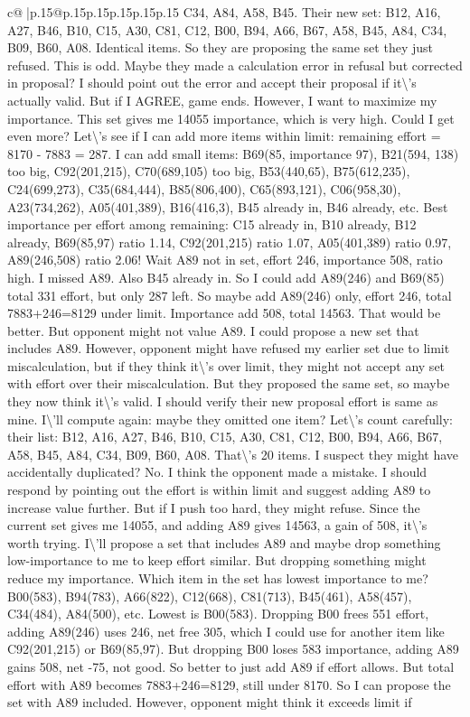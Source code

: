 \documentclass{article}
\begin{document}
{\begin{supertabular}{c@{$\;$}|p{.15\linewidth}@{}p{.15\linewidth}p{.15\linewidth}p{.15\linewidth}p{.15\linewidth}p{.15\linewidth}}
{{{C34, A84, A58, B45. Their new set: B12, A16, A27, B46, B10, C15, A30, C81, C12, B00, B94, A66, B67, A58, B45, A84, C34, B09, B60, A08. Identical items. So they are proposing the same set they just refused. This is odd. Maybe they made a calculation error in refusal but corrected in proposal? I should point out the error and accept their proposal if it\textbackslash{}'s actually valid. But if I AGREE, game ends. However, I want to maximize my importance. This set gives me 14055 importance, which is very high. Could I get even more? Let\textbackslash{}'s see if I can add more items within limit: remaining effort = 8170 {-} 7883 = 287. I can add small items: B69(85, importance 97), B21(594, 138) too big, C92(201,215), C70(689,105) too big, B53(440,65), B75(612,235), C24(699,273), C35(684,444), B85(806,400), C65(893,121), C06(958,30), A23(734,262), A05(401,389), B16(416,3), B45 already in, B46 already, etc. Best importance per effort among remaining: C15 already in, B10 already, B12 already, B69(85,97) ratio 1.14, C92(201,215) ratio 1.07, A05(401,389) ratio 0.97, A89(246,508) ratio 2.06! Wait A89 not in set, effort 246, importance 508, ratio high. I missed A89. Also B45 already in. So I could add A89(246) and B69(85) total 331 effort, but only 287 left. So maybe add A89(246) only, effort 246, total 7883+246=8129 under limit. Importance add 508, total 14563. That would be better. But opponent might not value A89. I could propose a new set that includes A89. However, opponent might have refused my earlier set due to limit miscalculation, but if they think it\textbackslash{}'s over limit, they might not accept any set with effort over their miscalculation. But they proposed the same set, so maybe they now think it\textbackslash{}'s valid. I should verify their new proposal effort is same as mine. I\textbackslash{}'ll compute again: maybe they omitted one item? Let\textbackslash{}'s count carefully: their list: B12, A16, A27, B46, B10, C15, A30, C81, C12, B00, B94, A66, B67, A58, B45, A84, C34, B09, B60, A08. That\textbackslash{}'s 20 items. I suspect they might have accidentally duplicated? No. I think the opponent made a mistake. I should respond by pointing out the effort is within limit and suggest adding A89 to increase value further. But if I push too hard, they might refuse. Since the current set gives me 14055, and adding A89 gives 14563, a gain of 508, it\textbackslash{}'s worth trying. I\textbackslash{}'ll propose a set that includes A89 and maybe drop something low{-}importance to me to keep effort similar. But dropping something might reduce my importance. Which item in the set has lowest importance to me? B00(583), B94(783), A66(822), C12(668), C81(713), B45(461), A58(457), C34(484), A84(500), etc. Lowest is B00(583). Dropping B00 frees 551 effort, adding A89(246) uses 246, net free 305, which I could use for another item like C92(201,215) or B69(85,97). But dropping B00 loses 583 importance, adding A89 gains 508, net {-}75, not good. So better to just add A89 if effort allows. But total effort with A89 becomes 7883+246=8129, still under 8170. So I can propose the set with A89 included. However, opponent might think it exceeds limit if }}}
\end{supertabular}}
\end{document}
